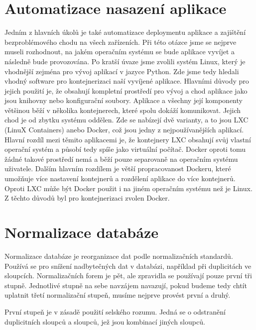 \newpage

\section{Automatizace nasazení aplikace}

Jedním z hlavních úkolů je také automatizace deploymentu aplikace a
zajištění bezproblémového chodu na všech zařízeních. Při této otázce
jsme se nejprve museli rozhodnout, na jakém operačním systému se bude
aplikace vyvíjet a následně bude provozována. Po kratší úvaze jsme
zvolili systém Linux, který je vhodnější zejména pro vývoj aplikací v
jazyce Python. Zde jsme tedy hledali vhodný software pro
kontejnerizaci naší vyvíjené aplikace. Hlavními důvody pro jejich
použití je, že obsahují kompletní prostředí pro vývoj a chod aplikace
jako jsou knihovny nebo konfigurační soubory. Aplikace a všechny její
komponenty většinou běží v několika kontejnerech, které spolu dokáží
komunikovat. Jejich chod je od zbytku systému oddělen. Zde se nabízejí
dvě varianty, a to jsou LXC (LinuX Containers) anebo Docker, což jsou
jedny z nejpoužívanějších aplikací. Hlavní rozdíl mezi těmito
aplikacemi je, že kontejnery LXC obsahují svůj vlastní operační systém
a působí tedy spíše jako virtuální počítač. Docker oproti tomu žádné
takové prostředí nemá a běží pouze separovaně na operačním systému
uživatele. Dalším hlavním rozdílem je větší propracovanost Dockeru,
které umožňuje více nastavení kontejnerů a rozdělení aplikace do více
kontejnerů. Oproti LXC může být Docker použit i na
jiném operačním systému než je Linux. Z těchto důvodů byl pro
kontejnerizaci zvolen Docker. \cite{deployment}

\newpage

\section{Normalizace databáze}

Normalizace databáze je reorganizace dat podle normalizačních standardů. 
Používá se pro snížení nadbytečných dat v databázi, například při duplicitách 
ve sloupcích. Normalizačních forem je pět, ale zpravidla se používají pouze 
první tři stupně. Jednotlivé stupně na sebe navzájem navazují, pokud budeme 
tedy chtít uplatnit třetí normalizační stupeň, musíme nejprve provést první a druhý.

První stupeň je v zásadě použití selského rozumu. Jedná se o odstranění 
duplicitních sloupců a sloupců, jež jsou kombinací jiných sloupců.

